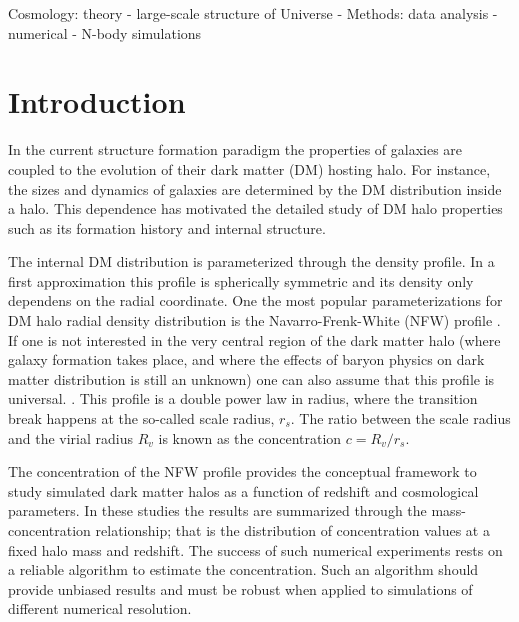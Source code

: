 \documentclass[a4,useAMS,usenatbib,usegraphicx]{mn2e}
\begin{document}
\begin{keywords}
Cosmology: theory - large-scale structure of Universe -
Methods: data analysis - numerical - N-body simulations
\end{keywords}


\section{Introduction}
\label{sec:introduction}
In the current structure formation paradigm the properties of galaxies
are coupled to the evolution of their dark matter (DM) hosting halo.
For instance, the sizes and dynamics of galaxies are determined by
the DM distribution inside a halo.
This dependence has motivated the detailed study of DM halo
properties such as its formation history and internal structure. 

The internal DM distribution is parameterized through the density
profile. 
In a first approximation this profile is spherically symmetric and
its density only dependens on the radial coordinate. 
One the most popular parameterizations for DM halo radial
density distribution is the Navarro-Frenk-White (NFW) profile
\citep{NFW}.   
If one is not interested in the very central region of the
dark matter halo (where galaxy formation takes place, and where the
effects of baryon physics on dark matter distribution is still an
unknown) one can also assume that this profile is universal.
\citep{Navarro2010}.  
 This profile is a double power law in radius, where the transition
break happens at the so-called scale radius, $r_s$.  
The ratio between the scale radius and the virial radius $R_v$ is
known as the concentration $c=R_v/r_s$. 


The concentration of the NFW profile provides the conceptual
framework to study simulated dark matter halos as a function of
redshift and cosmological parameters.
In these studies 
\citep{Neto2007,Maccio2008,Duffy2008,Munoz2011,Prada2012,Ludlow2014} 
the results are summarized through the
mass-concentration relationship; that is the distribution of
concentration values at a fixed halo mass and redshift.
The success of such numerical experiments rests on a
reliable algorithm to estimate the concentration. 
Such an algorithm should provide unbiased results and must be robust
when applied to simulations of different numerical resolution.  
\end{document}
